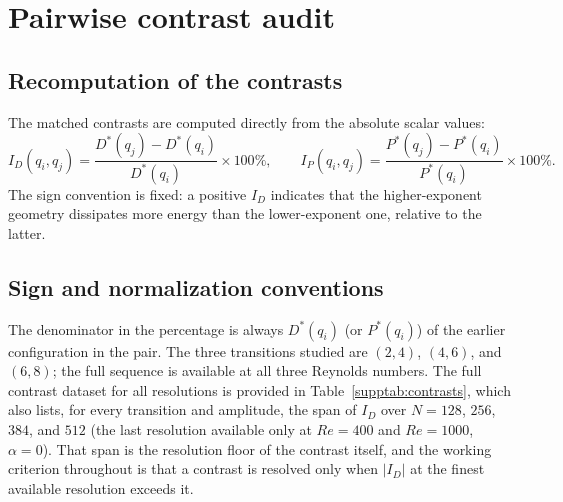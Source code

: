 \section{Pairwise contrast audit}
\label{suppsec:contrasts}

\subsection{Recomputation of the contrasts}

The matched contrasts are computed directly from the absolute scalar values:
\begin{equation}
I_D(q_i,q_j) = \frac{D^*(q_j)-D^*(q_i)}{D^*(q_i)}\times 100\%, \qquad
I_P(q_i,q_j) = \frac{P^*(q_j)-P^*(q_i)}{P^*(q_i)}\times 100\%.
\end{equation}
The sign convention is fixed: a positive $I_D$ indicates that the higher-exponent geometry dissipates more energy than the lower-exponent one, relative to the latter.

\subsection{Sign and normalization conventions}

The denominator in the percentage is always $D^*(q_i)$ (or $P^*(q_i)$) of the earlier configuration in the pair. The three transitions studied are $(2,4)$, $(4,6)$, and $(6,8)$; the full sequence is available at all three Reynolds numbers. The full contrast dataset for all resolutions is provided in Table~\ref{supptab:contrasts}, which also lists, for every transition and amplitude, the span of $I_D$ over $N=128$, $256$, $384$, and $512$ (the last resolution available only at $Re=400$ and $Re=1000$, $\alpha=0$). That span is the resolution floor of the contrast itself, and the working criterion throughout is that a contrast is resolved only when $|I_D|$ at the finest available resolution exceeds it.

